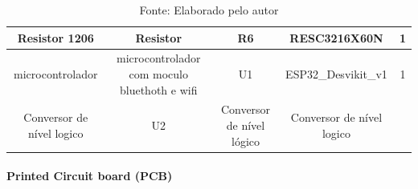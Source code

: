 \documentclass[../delivery_hospital_report.tex]{subfiles}
\begin{document}
\begin{table}[]
\begin{adjustbox}{width=\columnwidth,center}
\begin{tabular}{|c|c|c|c|c|}
Resistor 1206             & Resistor                                     & R6                        & RESC3216X60N              & 1        \\ \hline
microcontrolador          & microcontrolador com moculo bluethoth e wifi & U1                        & ESP32\_Desvikit\_v1       & 1        \\ \hline
Conversor de nível logico & U2                                           & Conversor de nível lógico & Conversor de nível logico &          \\ \hline

\end{tabular}
\end{adjustbox}
\centering
\caption*{Fonte: Elaborado pelo autor}
\label{table:voc}
\end{table}

\paragraph{Printed Circuit board (PCB)}
\end{document}
